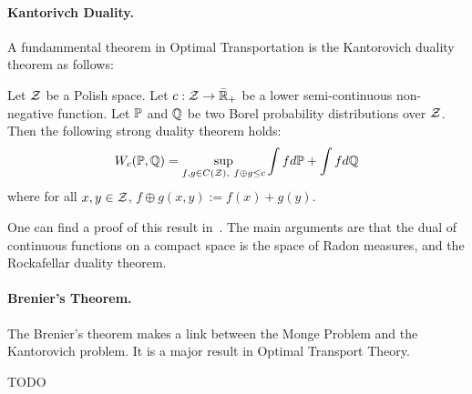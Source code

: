 \paragraph{Kantorivch Duality.} A fundammental theorem in Optimal Transportation is the Kantorovich duality theorem as follows:

\begin{thm}
    Let $\mathcal{Z}$ be a Polish space. Let $c:\mathcal{Z}\to\bar{\mathbb{R}}_+$ be a lower semi-continuous non-negative function. Let $\mathbb{P}$ and $\mathbb{Q}$ be two Borel probability distributions over $\mathcal{Z}$. Then   the following strong duality theorem holds:
\begin{align*}
    W_c(\mathbb{P},\mathbb{Q})=\sup_{f,g\in C(\mathcal{Z}),~f\oplus g\leq c}   \int fd\mathbb{P}+\int fd\mathbb{Q}
\end{align*}
where for all $x,y\in\mathcal{Z}$, $f\oplus g(x,y):=f(x)+g(y)$. 
\end{thm}
One can find a proof of this result in~\citep{villani2003topics}. The main arguments are that the dual of continuous functions on  a compact space is the space of Radon measures, and the Rockafellar duality theorem. 


\paragraph{Brenier's Theorem.} The Brenier's theorem makes a link between the Monge Problem and the Kantorovich problem. It is a major result in Optimal Transport Theory.
\begin{thm}
    TODO
    
\end{thm}
